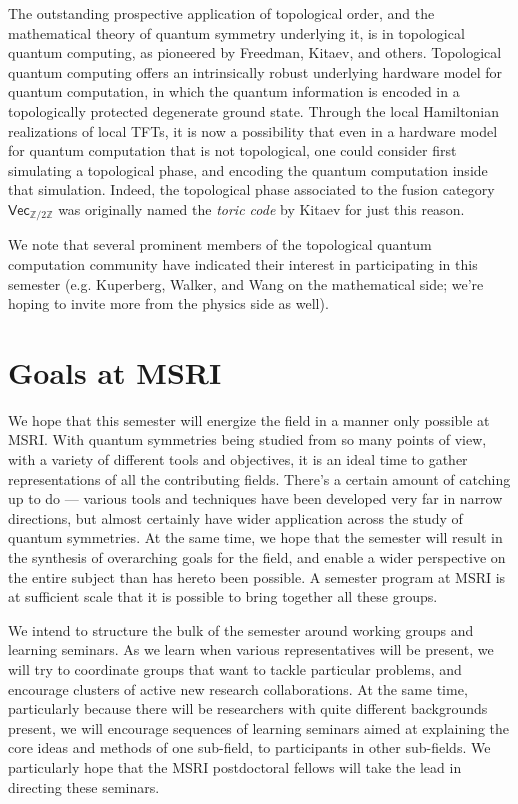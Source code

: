 \documentclass[12pt]{article}
\begin{document}
The outstanding prospective application of topological order, and the mathematical theory of quantum symmetry underlying it, is in topological quantum computing, as pioneered by Freedman, Kitaev, and others. Topological quantum computing offers an intrinsically robust underlying hardware model for quantum computation, in which the quantum information is encoded in a topologically protected degenerate ground state. Through the local Hamiltonian realizations of local TFTs, it is now a possibility that even in a hardware model for quantum computation that is not topological, one could consider first simulating a topological phase, and encoding the quantum computation inside that simulation. Indeed, the topological phase associated to the fusion category $\textsf{Vec}_{\mathbb Z / 2 \mathbb Z}$ was originally named the \emph{toric code} by Kitaev for just this reason.

We note that several prominent members of the topological quantum computation community   have indicated their interest in participating in this semester (e.g.  Kuperberg, Walker, and Wang on the mathematical side; we're hoping to invite more from the physics side as well).

\section{Goals at MSRI}
We hope that this semester will energize the field in a manner only possible at MSRI. With quantum symmetries being studied from so many points of view, with a variety of different tools and objectives, it is an ideal time to gather representations of all the contributing fields. There's a certain amount of catching up to do --- various tools and techniques have been developed very far in narrow directions, but almost certainly have wider application across the study of quantum symmetries.  At the same time, we hope that the semester will result in the synthesis of overarching goals for the field, and enable a wider perspective on the entire subject than has hereto been possible. A semester program at MSRI is at sufficient scale that it is possible to bring together all these groups.

We intend to structure the bulk of the semester around working groups and learning seminars. As we learn when various representatives will be present, we will try to coordinate groups that want to tackle particular problems, and encourage clusters of active new research collaborations. At the same time, particularly because there will be researchers with quite different backgrounds present, we will encourage sequences of learning seminars aimed at explaining the core ideas and methods of one sub-field, to participants in other sub-fields. We particularly hope that the MSRI postdoctoral fellows will take the lead in directing these seminars.
\end{document}

